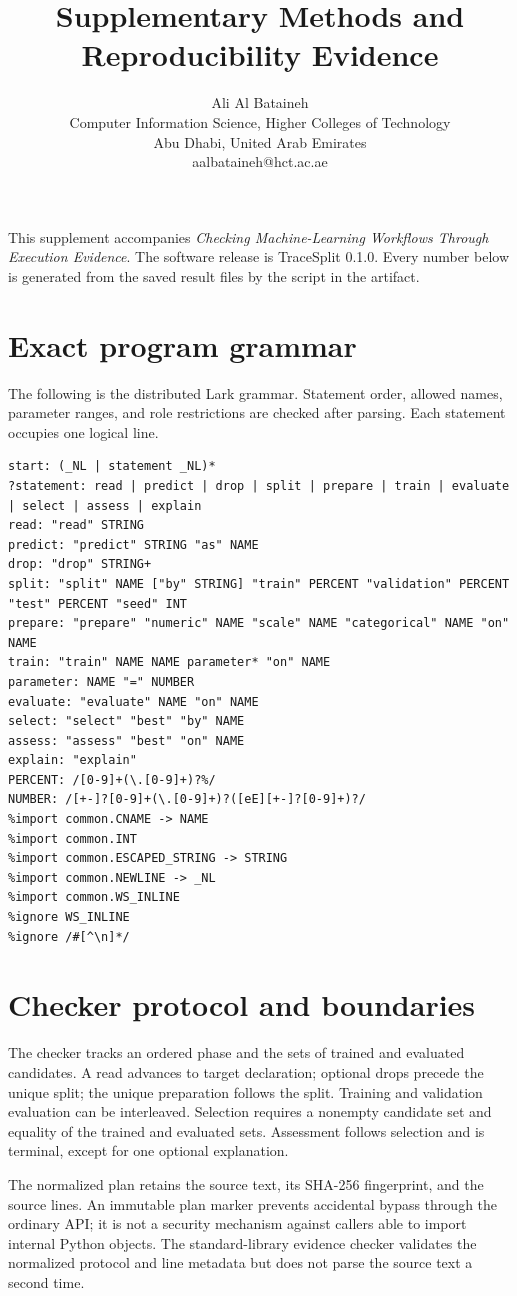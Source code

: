 \documentclass[11pt,letterpaper]{article}
\title{Supplementary Methods and Reproducibility Evidence}
\author{Ali Al Bataineh\\Computer Information Science, Higher Colleges of Technology\\Abu Dhabi, United Arab Emirates\\aalbataineh@hct.ac.ae}
\date{}
\begin{document}
\maketitle
\vspace{-1em}
This supplement accompanies \emph{Checking Machine-Learning Workflows Through Execution Evidence}. The software release is TraceSplit 0.1.0. Every number below is generated from the saved result files by the script  in the artifact.

\section{Exact program grammar}
The following is the distributed Lark grammar. Statement order, allowed names, parameter ranges, and role restrictions are checked after parsing. Each statement occupies one logical line.
\begin{lstlisting}
start: (_NL | statement _NL)*
?statement: read | predict | drop | split | prepare | train | evaluate | select | assess | explain
read: "read" STRING
predict: "predict" STRING "as" NAME
drop: "drop" STRING+
split: "split" NAME ["by" STRING] "train" PERCENT "validation" PERCENT "test" PERCENT "seed" INT
prepare: "prepare" "numeric" NAME "scale" NAME "categorical" NAME "on" NAME
train: "train" NAME NAME parameter* "on" NAME
parameter: NAME "=" NUMBER
evaluate: "evaluate" NAME "on" NAME
select: "select" "best" "by" NAME
assess: "assess" "best" "on" NAME
explain: "explain"
PERCENT: /[0-9]+(\.[0-9]+)?%/
NUMBER: /[+-]?[0-9]+(\.[0-9]+)?([eE][+-]?[0-9]+)?/
%import common.CNAME -> NAME
%import common.INT
%import common.ESCAPED_STRING -> STRING
%import common.NEWLINE -> _NL
%import common.WS_INLINE
%ignore WS_INLINE
%ignore /#[^\n]*/
\end{lstlisting}

\section{Checker protocol and boundaries}
The checker tracks an ordered phase and the sets of trained and evaluated candidates. A read advances to target declaration; optional drops precede the unique split; the unique preparation follows the split. Training and validation evaluation can be interleaved. Selection requires a nonempty candidate set and equality of the trained and evaluated sets. Assessment follows selection and is terminal, except for one optional explanation.

The normalized plan retains the source text, its SHA-256 fingerprint, and the source lines. An immutable plan marker prevents accidental bypass through the ordinary API; it is not a security mechanism against callers able to import internal Python objects. The standard-library evidence checker validates the normalized protocol and line metadata but does not parse the source text a second time.
\end{document}
